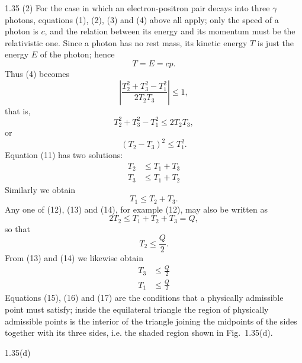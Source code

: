 \begin{solution}{1.35}
(2) For the case in which an electron-positron pair decays into three $\gamma$ photons, equations (1), (2), (3) and (4) above all apply; only the speed of a photon is $c$, and the relation between its energy and its momentum must be the relativistic one. Since a photon has no rest mass, its kinetic energy $T$ is just the energy $E$ of the photon; hence
\begin{equation}
T=E=cp. \tag{10}
\end{equation}
Thus (4) becomes
\[
\left|\frac{T_2^2+T_3^2-T_1^2}{2T_2T_3}\right|\le1,
\]
that is,
\[
T_2^2+T_3^2-T_1^2\le2T_2T_3,
\]
or
\begin{equation}
(T_2-T_3)^2\le T_1^2. \tag{11}
\end{equation}
Equation (11) has two solutions:
\begin{align}
T_2 &\le T_1+T_3 \tag{12}\\
T_3 &\le T_1+T_2 \tag{13}
\end{align}
Similarly we obtain
\begin{equation}
T_1\le T_2+T_3. \tag{14}
\end{equation}
Any one of (12), (13) and (14), for example (12), may also be written as
\[
2T_2\le T_1+T_2+T_3=Q,
\]
so that
\begin{equation}
T_2\le\frac{Q}{2}. \tag{15}
\end{equation}
From (13) and (14) we likewise obtain
\begin{align}
T_3 &\le\frac{Q}{2} \tag{16}\\
T_1 &\le\frac{Q}{2} \tag{17}
\end{align}
Equations (15), (16) and (17) are the conditions that a physically admissible point must satisfy; inside the equilateral triangle the region of physically admissible points is the interior of the triangle joining the midpoints of the sides together with its three sides, i.e. the shaded region shown in Fig.~1.35(d).

\begin{figbox}{1.35(d)}
\end{figbox}

\end{solution}

